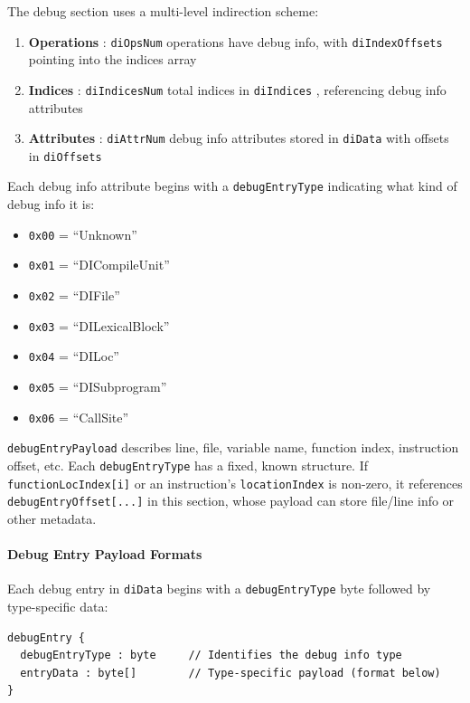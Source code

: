 \documentclass{article}
\begin{document}
The debug section uses a multi-level indirection scheme:


\begin{enumerate}
\item \textbf{Operations} : \texttt{diOpsNum} operations have debug info, with \texttt{diIndexOffsets} pointing into the indices array
\item \textbf{Indices} : \texttt{diIndicesNum} total indices in \texttt{diIndices} , referencing debug info attributes
\item \textbf{Attributes} : \texttt{diAttrNum} debug info attributes stored in \texttt{diData} with offsets in \texttt{diOffsets}

\end{enumerate}
Each debug info attribute begins with a \texttt{debugEntryType} indicating what kind of debug info it is:


\begin{itemize}
\item \texttt{0x00} = ``Unknown''
\item \texttt{0x01} = ``DICompileUnit''
\item \texttt{0x02} = ``DIFile''
\item \texttt{0x03} = ``DILexicalBlock''
\item \texttt{0x04} = ``DILoc''
\item \texttt{0x05} = ``DISubprogram''
\item \texttt{0x06} = ``CallSite''

\end{itemize}
\texttt{debugEntryPayload} describes line, file, variable name, function index, instruction offset, etc. Each \texttt{debugEntryType} has a fixed, known structure. If \texttt{functionLocIndex[i]} or an instruction's \texttt{locationIndex} is non-zero, it references \texttt{debugEntryOffset[...]} in this section, whose payload can store file/line info or other metadata.



\paragraph{Debug Entry Payload Formats}

Each debug entry in \texttt{diData} begins with a \texttt{debugEntryType} byte followed by type-specific data:


\begin{lstlisting}
debugEntry {
  debugEntryType : byte     // Identifies the debug info type
  entryData : byte[]        // Type-specific payload (format below)
}
\end{lstlisting}
\end{document}
